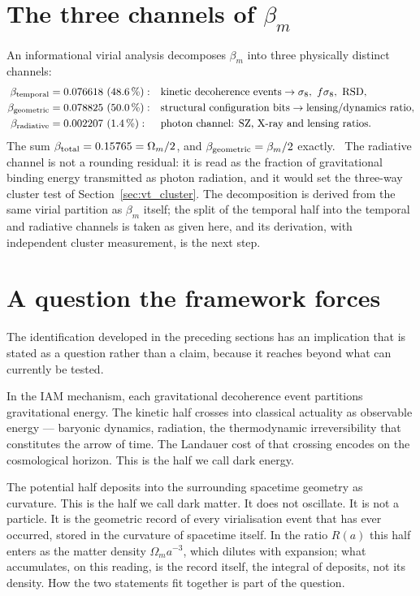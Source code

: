 \section{The three channels of $\beta_m$}\label{sec:vp_channels}
An informational virial analysis decomposes $\beta_m$ into three physically distinct channels:
{\small\begin{align}
\beta_{\rm temporal}&=0.076618\ (48.6\,\%):&&\text{kinetic decoherence events}\to\sigma_8,\ f\sigma_8,\ \text{RSD},\nonumber\\
\beta_{\rm geometric}&=0.078825\ (50.0\,\%):&&\text{structural configuration bits}\to\text{lensing/dynamics ratio},\label{eq:vp_channels}\\
\beta_{\rm radiative}&=0.002207\ (1.4\,\%):&&\text{photon channel: SZ, X-ray and lensing ratios}.\nonumber
\end{align}}
The sum $\beta_{\rm total}=0.15765=\Omega_m/2$, and $\beta_{\rm geometric}=\beta_m/2$ exactly. \calc\ The radiative channel is not a rounding residual: it is
read as the fraction of gravitational binding energy transmitted as photon radiation, and it would set the three-way cluster test of
Section~\ref{sec:vt_cluster}. The decomposition is derived from the same virial partition as $\beta_m$ itself; the split of the temporal half into the temporal and radiative channels is taken as given here, and its derivation, with independent cluster measurement, is the next step. \conjecture\ \openprob

\section{A question the framework forces}\label{sec:vp_question}
The identification developed in the preceding sections has an implication that is stated as a question rather than a claim, because it reaches beyond what
can currently be tested. \conjecture

In the IAM mechanism, each gravitational decoherence event partitions gravitational energy. The kinetic half crosses into classical actuality as observable
energy --- baryonic dynamics, radiation, the thermodynamic irreversibility that constitutes the arrow of time. The Landauer cost of that crossing encodes
on the cosmological horizon. This is the half we call dark energy.

The potential half deposits into the surrounding spacetime geometry as curvature. This is the half we call dark matter. It does not oscillate. It is not a
particle. It is the geometric record of every virialisation event that has ever occurred, stored in the curvature of spacetime itself. In the ratio $R(a)$
this half enters as the matter density $\Omega_ma^{-3}$, which dilutes with expansion; what accumulates, on this reading, is the record itself, the
integral of deposits, not its density. How the two statements fit together is part of the question. \openprob

